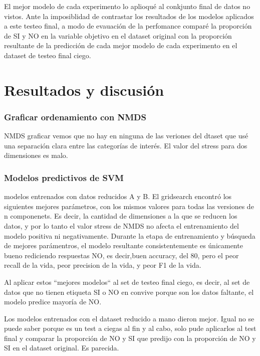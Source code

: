 \documentclass[10 pt]{article}
\begin{document}
El mejor modelo de cada experimento lo aplioqué al conkjunto final de datos no vistos. Ante la imposiblidad de contrastar los resultados de los modelos aplicados a este testeo final, a modo de evauación de la perfomance comparé la proporción de SI y NO en la variable objetivo en el dataset original con la proporción resultante de la predicción de cada mejor modelo de cada experimento en el dataset de testeo final ciego.




\section{Resultados y discusión}\label{resultados}

\subsubsection{Graficar ordenamiento con NMDS}

NMDS graficar vemos que no hay en ninguna de las veriones del dtaset que usé una separación clara entre las categorías de interés. El valor del stress para dos dimensiones es malo.




\subsubsection{Modelos predictivos de SVM}

modelos entrenados con datos reducidos A y B. El gridsearch encontró los siguientes mejores parámetros, con los mismos valores para todas las versiones de n componenets. Es decir, la cantidad de dimensiones a la que se reducen los datos, y por lo tanto el valor stress de NMDS no afecta el entrenamiento del modelo positiva ni negativamente. Durante la etapa de entrenamiento y búsqueda de mejores parámentros, el modelo resultante consistentemente es únicamente bueno rediciendo respuestas NO, es decir,buen accuracy, del 80, pero el peor recall de la vida, peor precision de la vida, y peor F1 de la vida.

Al aplicar estos “mejores modelos“ al set de testeo final ciego, es decir, al set de datos que no tienen etiqueta SI o NO en convive porque son los datos faltante, el modelo predice mayoría de NO.


Los modelos entrenados con el dataset reducido a mano dieron mejor. Igual no se puede saber porque es un test a ciegas al fin y al cabo, solo pude aplicarlos al test final y comparar la proporción de NO y SI que predijo con la proporción de NO y SI en el dataset original. Es parecida.
\end{document}
